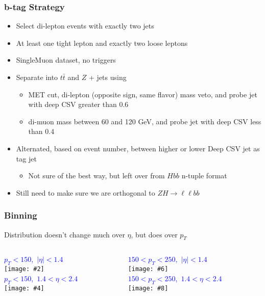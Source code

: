 \documentclass{beamer}
\newcommand{\fourfigs}[8]{
  \begin{columns}
    \begin{column}{0.3\linewidth}
      \centering
      \textcolor{blue}{#1} \\
      \texttt{[image: \#2]} \\
      \textcolor{blue}{#3} \\
      \texttt{[image: \#4]}
    \end{column}
    \begin{column}{0.3\linewidth}
      \centering
      \textcolor{blue}{#5} \\
      \texttt{[image: \#6]} \\
      \textcolor{blue}{#7} \\
      \texttt{[image: \#8]}
    \end{column}
  \end{columns}
}
\newcommand{\ttbar}{\ensuremath{t\bar{t}}}
\begin{document}
\begin{frame}
  \frametitle{b-tag Strategy}

  \begin{itemize}
  \item Select di-lepton events with exactly two jets
  \item At least one tight lepton and exactly two loose leptons
  \item SingleMuon dataset, no triggers
  \item Separate into $\ttbar$ and $Z$ + jets using
    \begin{itemize}
    \item MET cut, di-lepton (opposite sign, same flavor) mass veto, and
      probe jet with deep CSV greater than 0.6
    \item di-muon mass between 60 and 120 GeV, and
      probe jet with deep CSV less than 0.4
    \end{itemize}
  \item Alternated, based on event number, between higher or lower Deep CSV jet as tag jet
    \begin{itemize}
    \item Not sure of the best way, but left over from $Hbb$ n-tuple format
    \end{itemize}
  \item Still need to make sure we are orthogonal to $ZH \rightarrow \ell\ell bb$
  \end{itemize}

\end{frame}

\begin{frame}
  \frametitle{Binning}

  Distribution doesn't change much over $\eta$, but does over $p_T$

  \fourfigs{\mbox{$p_T < 150$, $|\eta| < 1.4$}}
           {190214_tnp_bjets/light_pt_0_150_eta_0_1p4_probe_deepCSVb.pdf}
           {\mbox{$p_T < 150$, $1.4 < \eta < 2.4$}}
           {190214_tnp_bjets/light_pt_0_150_eta_1p4_2p5_probe_deepCSVb.pdf}
           {\mbox{$150 < p_T < 250$, $|\eta| < 1.4$}}
           {190214_tnp_bjets/light_pt_150_250_eta_0_1p4_probe_deepCSVb.pdf}
           {\mbox{$150 < p_T < 250$, $1.4 < \eta < 2.4$}}
           {190214_tnp_bjets/light_pt_150_250_eta_1p4_2p5_probe_deepCSVb.pdf}
           
\end{frame}
\end{document}
